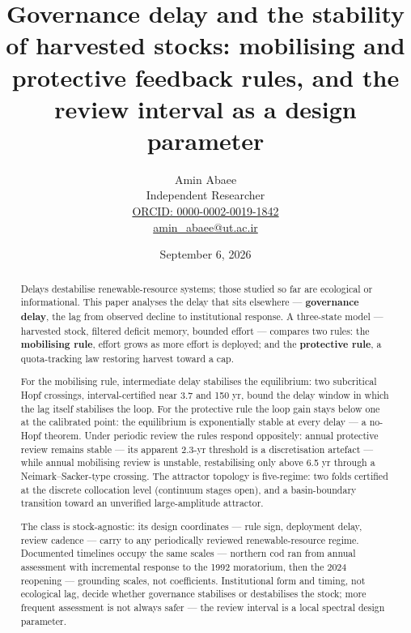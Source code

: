 \documentclass[11pt]{article}
\begin{document}
\title{Governance delay and the stability of harvested stocks: mobilising and protective feedback rules, and the review interval as a design parameter}
\author{Amin Abaee\\[0.35em]
{\small Independent Researcher}\\[0.55em]
{\small\href{https://orcid.org/0000-0002-0019-1842}{ORCID: 0000-0002-0019-1842}}\\[0.3em]
{\small\href{mailto:amin\_abaee@ut.ac.ir}{amin\_abaee@ut.ac.ir}}}
\date{September 6, 2026}
\maketitle

\begin{abstract}


Delays destabilise renewable-resource systems; those studied so far are
ecological or informational. This paper analyses the delay that sits
elsewhere --- \textbf{governance delay}, the lag from observed decline
to institutional response. A three-state model --- harvested stock,
filtered deficit memory, bounded effort --- compares two rules: the
\textbf{mobilising rule}, effort grows as more effort is deployed; and
the \textbf{protective rule}, a quota-tracking law restoring harvest
toward a cap.

For the mobilising rule, intermediate delay stabilises the equilibrium:
two subcritical Hopf crossings, interval-certified near 3.7 and 150 yr,
bound the delay window in which the lag itself stabilises the loop. For
the protective rule the loop gain stays below one at the calibrated
point: the equilibrium is exponentially stable at every delay --- a
no-Hopf theorem. Under periodic review the rules respond oppositely:
annual protective review remains stable --- its apparent 2.3-yr
threshold is a discretisation artefact --- while annual mobilising
review is unstable, restabilising only above 6.5 yr through a
Neimark--Sacker-type crossing. The attractor topology is five-regime:
two folds certified at the discrete collocation level (continuum stages
open), and a basin-boundary transition toward an unverified
large-amplitude attractor.

The class is stock-agnostic: its design coordinates --- rule sign,
deployment delay, review cadence --- carry to any periodically reviewed
renewable-resource regime. Documented timelines occupy the same scales
--- northern cod ran from annual assessment with incremental response to
the 1992 moratorium, then the 2024 reopening --- grounding scales, not
coefficients. Institutional form and timing, not ecological lag, decide
whether governance stabilises or destabilises the stock; more frequent
assessment is not always safer --- the review interval is a local
spectral design parameter.

\end{abstract}
\end{document}
